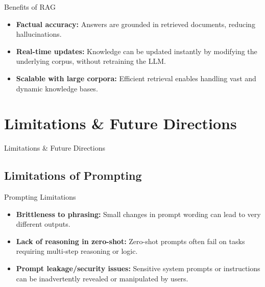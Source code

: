 \begin{frame}{Benefits of RAG}
    \begin{itemize}
        \setlength{\itemsep}{1em}
        \item \textbf{Factual accuracy:} Answers are grounded in retrieved documents, reducing hallucinations.
        \item \textbf{Real-time updates:} Knowledge can be updated instantly by modifying the underlying corpus, without retraining the LLM.
        \item \textbf{Scalable with large corpora:} Efficient retrieval enables handling vast and dynamic knowledge bases.
    \end{itemize}
\end{frame}


\section{Limitations \& Future Directions}
\begin{frame}{}
    \LARGE Limitations \& Future Directions
\end{frame}

\subsection{Limitations of Prompting}
\begin{frame}{Prompting Limitations}
    \begin{itemize}
        \setlength{\itemsep}{1em}
        \item \textbf{Brittleness to phrasing:} Small changes in prompt wording can lead to very different outputs.
        \item \textbf{Lack of reasoning in zero-shot:} Zero-shot prompts often fail on tasks requiring multi-step reasoning or logic.
        \item \textbf{Prompt leakage/security issues:} Sensitive system prompts or instructions can be inadvertently revealed or manipulated by users.
    \end{itemize}
\end{frame}


